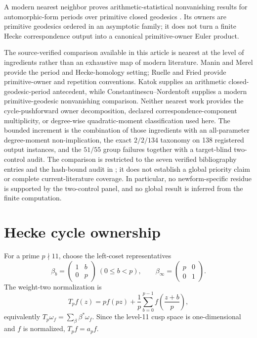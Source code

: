 \documentclass[11pt]{article}
\theoremstyle{definition}
\theoremstyle{remark}
\begin{document}
A modern nearest neighbor proves arithmetic-statistical nonvanishing results for automorphic-form periods over primitive closed geodesics \citep[Introduction and main theorems]{ConstantinescuNordentoft2025}. Its owners are primitive geodesics ordered in an asymptotic family; it does not turn a finite Hecke correspondence output into a canonical primitive-owner Euler product.

The source-verified comparison available in this article is nearest at the level of ingredients rather than an exhaustive map of modern literature. Manin and Merel provide the period and Hecke-homology setting; Ruelle and Fried provide primitive-owner and repetition conventions. Katok supplies an arithmetic closed-geodesic-period antecedent, while Constantinescu--Nordentoft supplies a modern primitive-geodesic nonvanishing comparison. Neither nearest work provides the cycle-pushforward owner decomposition, declared correspondence-component multiplicity, or degree-wise quadratic-moment classification used here. The bounded increment is the combination of those ingredients with an all-parameter degree-moment non-implication, the exact $2/2/134$ taxonomy on 138 registered output instances, and the $51/55$ group failures together with a target-blind two-control audit. The comparison is restricted to the seven verified bibliography entries and the hash-bound audit in ; it does not establish a global priority claim or complete current-literature coverage. In particular, no newform-specific residue is supported by the two-control panel, and no global result is inferred from the finite computation.

\section{Hecke cycle ownership}

For a prime $p\nmid11$, choose the left-coset representatives
\[
\beta_b=\begin{pmatrix}1&b\\0&p\end{pmatrix}\ (0\leq b<p),
\qquad
\beta_\infty=\begin{pmatrix}p&0\\0&1\end{pmatrix}.
\]
The weight-two normalization is
\[
T_pf(z)=pf(pz)+\frac1p\sum_{b=0}^{p-1}f\!\left(\frac{z+b}{p}\right),
\]
equivalently $T_p\omega_f=\sum_\beta\beta^*\omega_f$. Since the level-11 cusp space is one-dimensional and $f$ is normalized, $T_pf=a_pf$.
\end{document}
